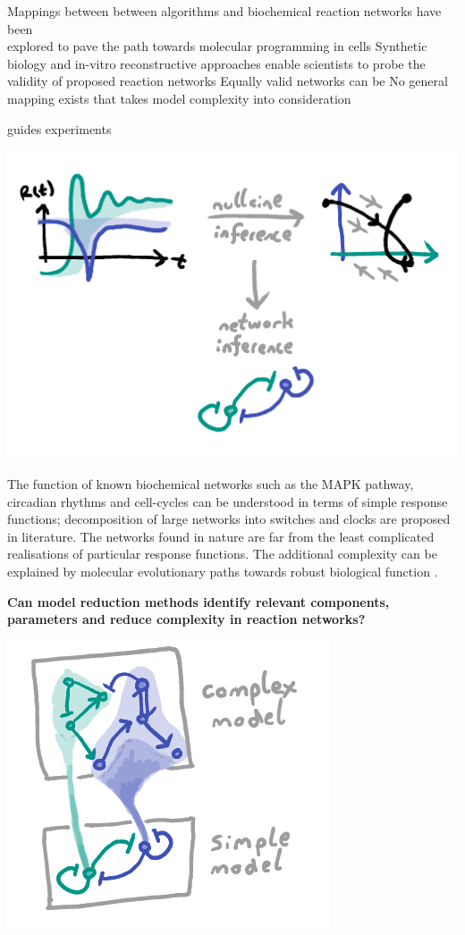 \documentclass[a0,portrait]{a0poster}
\begin{document}
\begin{itemize}[leftmargin=5cm]
	\up Mappings between between algorithms and biochemical reaction networks have been\\
	explored to pave the path towards molecular programming in cells \cite{Dalchau2018ComputingClocks}
	\up Synthetic biology and in-vitro reconstructive approaches \cite{Loose2011MinMinE}
	enable scientists to probe the validity of proposed reaction networks
	\down Equally valid networks can be 
	\down No general mapping exists that takes model complexity into consideration
\end{itemize}
guides experiments
\begin{center}
\includegraphics[width=0.2\linewidth]{inference}
\end{center}\noindent
The function of known biochemical networks such as the MAPK pathway,
circadian rhythms and cell-cycles can be understood in terms of simple
response functions; decomposition of large networks into switches and
clocks are proposed in literature.
\medbreak\medbreak\noindent
The networks found in nature are far from the least complicated realisations
of particular response functions. The additional complexity can be
explained by molecular evolutionary paths towards robust biological function
\cite{DanielsSloppinessBiology}.
\medbreak
\begin{tcolorbox}[boxrule=2pt,arc=3.4pt,boxsep=2mm]
\begin{center}\color{DarkRed}
\textbf{Can model reduction methods \cite{Cardelli2016NoiseSwitches} identify relevant components,
parameters and reduce complexity in reaction networks?}
\end{center}
\end{tcolorbox}
\begin{center}
\includegraphics[width=0.9\linewidth]{reduction}
\end{center}
\end{document}
